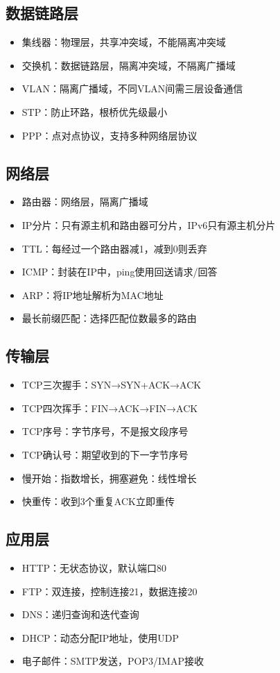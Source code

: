 \subsection{数据链路层}
\begin{itemize}[leftmargin=2em,itemsep=0pt]
    \item 集线器：物理层，共享冲突域，不能隔离冲突域
    \item 交换机：数据链路层，隔离冲突域，不隔离广播域
    \item VLAN：隔离广播域，不同VLAN间需三层设备通信
    \item STP：防止环路，根桥优先级最小
    \item PPP：点对点协议，支持多种网络层协议
\end{itemize}

\subsection{网络层}
\begin{itemize}[leftmargin=2em,itemsep=0pt]
    \item 路由器：网络层，隔离广播域
    \item IP分片：只有源主机和路由器可分片，IPv6只有源主机分片
    \item TTL：每经过一个路由器减1，减到0则丢弃
    \item ICMP：封装在IP中，ping使用回送请求/回答
    \item ARP：将IP地址解析为MAC地址
    \item 最长前缀匹配：选择匹配位数最多的路由
\end{itemize}

\subsection{传输层}
\begin{itemize}[leftmargin=2em,itemsep=0pt]
    \item TCP三次握手：SYN→SYN+ACK→ACK
    \item TCP四次挥手：FIN→ACK→FIN→ACK
    \item TCP序号：字节序号，不是报文段序号
    \item TCP确认号：期望收到的下一字节序号
    \item 慢开始：指数增长，拥塞避免：线性增长
    \item 快重传：收到3个重复ACK立即重传
\end{itemize}

\subsection{应用层}
\begin{itemize}[leftmargin=2em,itemsep=0pt]
    \item HTTP：无状态协议，默认端口80
    \item FTP：双连接，控制连接21，数据连接20
    \item DNS：递归查询和迭代查询
    \item DHCP：动态分配IP地址，使用UDP
    \item 电子邮件：SMTP发送，POP3/IMAP接收
\end{itemize}

